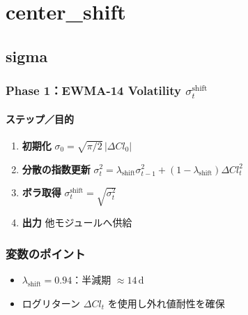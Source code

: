 
\section*{center\_shift}\nopagebreak[4]

\subsection*{sigma}\nopagebreak[4]

\subsubsection*{Phase 1：EWMA-14 Volatility $\sigma_t^{\text{shift}}$}\nopagebreak[4]
\paragraph{ステップ／目的}
\begin{flushleft}
\begin{enumerate}
  \item \textbf{初期化}\;
        \(\sigma_{0}=\sqrt{\pi/2}\,|\Delta Cl_{0}|\)
  \item \textbf{分散の指数更新}\;
        \(\sigma_t^{2}
          =\lambda_{\text{shift}}\sigma_{t-1}^{2}
          +(1-\lambda_{\text{shift}})\Delta Cl_t^{2}\)
  \item \textbf{ボラ取得}\;
        \(\boxed{\sigma_t^{\text{shift}}=\sqrt{\sigma_t^{2}}}\)
  \item \textbf{出力}\;
        他モジュールへ供給
\end{enumerate}
\end{flushleft}

\subsubsection*{変数のポイント}
\begin{flushleft}
\begin{itemize}
  \item \(\lambda_{\text{shift}}=0.94\)：半減期 \(\approx14\,\text{d}\)
  \item ログリターン \(\Delta Cl_t\) を使用し外れ値耐性を確保
\end{itemize}
\end{flushleft}

